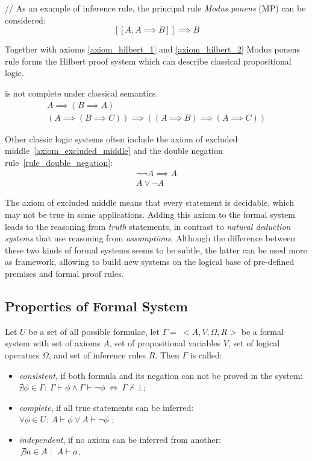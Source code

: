 \documentclass[article]{aaltoseries}
\begin{document}
// As an example of inference rule, the principal rule \textit{Modus ponens} (MP) can be considered: 
\begin{equation}\label{rule_modus_ponens}\tag{MP}
[\![ A, A \implies B ]\!] \implies B
\end{equation}

Together with axioms \ref{axiom_hilbert_1} and \ref{axiom_hilbert_2} Modus ponens rule forms the Hilbert proof system which can describe classical propositional logic.

is not complete under classical semantics.
\begin{gather}
A \implies (B \implies A)
	\label{axiom_hilbert_1}\tag{A1} \\
%
(A \implies (B \implies C)) \implies ((A \implies B) \implies (A \implies C))
	\label{axiom_hilbert_2}\tag{A2}
\end{gather}

Other classic logic systems often include the axiom of excluded middle~\ref{axiom_excluded_middle} and the double negation rule~\ref{rule_double_negation}:
\begin{gather}
\neg \neg A \implies A
	\label{axiom_excluded_middle}\tag{EM} \\
%
A \lor \neg A
	\label{rule_double_negation}\tag{DN}
\end{gather}

The axiom of excluded middle means that every statement is decidable, which may not be true in some applications. Adding this axiom to the formal system leads to the reasoning from \textit{truth} statements, in contrast to \textit{natural deduction systems} that use reasoning from \textit{assumptions}. Although the difference between these two kinds of formal systems seems to be subtle, the latter can be used more as framework, allowing to build new systems on the logical base of pre-defined premises and formal proof rules. %

\subsection{Properties of Formal System}

Let $U$ be a set of all possible formulae, let $\Gamma = \ <A, V, \Omega, R>$ be a formal system with set of axioms $A$, set of propositional variables $V$, set of logical operators $\Omega$, and set of inference rules $R$. Then $\Gamma$ is called:
\begin{itemize}
	\itemsep0em
	\item \textit{consistent}, if both formula and its negation can not be proved in the system: \\
		$\nexists \phi \in \Gamma: \ \Gamma \vdash \phi \land \Gamma \vdash \neg \phi  \ \Leftrightarrow \ \Gamma \nvdash \bot$;
	\item \textit{complete}, if all true statements can be inferred: \\
		$\forall \phi \in U: \ A \vdash \phi \lor A \vdash \neg \phi$ ;
	\item \textit{independent}, if no axiom can be inferred from another: \\
		$\not \exists a \in A: \ A \vdash a$.
\end{itemize}
\end{document}
